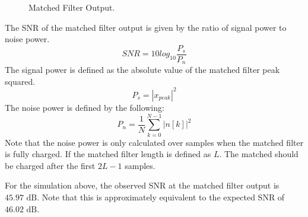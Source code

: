 \documentclass[conference]{IEEEtran}
\begin{document}
\begin{figure}[H]
\centerline{}
\caption{Matched Filter Output.}
\label{mf_output}
\end{figure}
\noindent
The SNR of the matched filter output is given by the ratio of signal power to noise power.
\begin{equation}
SNR = 10log_{10}\frac{P_s}{P_n}
\end{equation}
The signal power is defined as the absolute value of the matched filter peak squared.
\begin{equation}
P_s = |x_{peak}|^2
\end{equation}
The noise power is defined by the following:
\begin{equation}
P_n = \frac{1}{N}\sum_{k=0}^{N-1}|n[k]|^2
\end{equation}
Note that the noise power is only calculated over samples when the matched filter is fully charged. If the matched filter length is defined as $L$. The matched should be charged after the first $2L-1$ samples.
\par
For the simulation above, the observed SNR at the matched filter output is $45.97 \text{ dB}$. Note that this is approximately equivalent to the expected SNR of $46.02 \text{ dB}$.


% 
\end{document}
